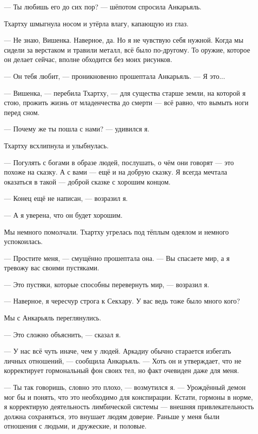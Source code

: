 --- Ты любишь его до сих пор? --- шёпотом спросила Анкарьяль.

Тхартху шмыгнула носом и утёрла влагу, капающую из глаз.

--- Не знаю, Вишенка.
Наверное, да.
Но я не чувствую себя нужной.
Когда мы сидели за верстаком и травили металл, всё было по-другому.
То оружие, которое он делает сейчас, вполне обходится без моих рисунков.

--- Он тебя любит, --- проникновенно прошептала Анкарьяль.
--- Я это...

--- Вишенка, --- перебила Тхартху, --- для существа старше земли, на которой я стою, прожить жизнь от младенчества до смерти --- всё равно, что вымыть ноги перед сном.

--- Почему же ты пошла с нами? --- удивился я.

Тхартху всхлипнула и улыбнулась.

--- Погулять с богами в образе людей, послушать, о чём они говорят --- это похоже на сказку.
А с вами --- ещё и на добрую сказку.
Я всегда мечтала оказаться в такой --- доброй сказке с хорошим концом.

--- Конец ещё не написан, --- возразил я.

--- А я уверена, что он будет хорошим.

Мы немного помолчали.
Тхартху угрелась под тёплым одеялом и немного успокоилась.

--- Простите меня, --- смущённо прошептала она.
--- Вы спасаете мир, а я тревожу вас своими пустяками.

--- Это пустяки, которые способны перевернуть мир, --- возразил я.

--- Наверное, я чересчур строга к Секхару.
У вас ведь тоже было много кого?

Мы с Анкарьяль переглянулись.

--- Это сложно объяснить, --- сказал я.

--- У нас всё чуть иначе, чем у людей.
Аркадиу обычно старается избегать личных отношений, --- сообщила Анкарьяль.
--- Хоть он и утверждает, что не корректирует гормональный фон своих тел, но факт очевиден даже для меня.

--- Ты так говоришь, словно это плохо, --- возмутился я.
--- Урождённый демон мог бы и понять, что это необходимо для конспирации.
Кстати, гормоны в норме, я корректирую деятельность лимбической системы --- внешняя привлекательность должна сохраняться, это внушает людям доверие.
Раньше у меня были отношения с людьми, и дружеские, и половые.

